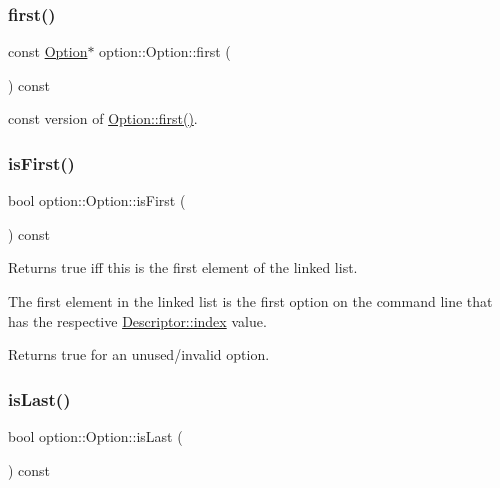\subsubsection{\texorpdfstring{first()}{first()}\hspace{0.1cm}{\footnotesize\ttfamily [2/2]}}
{\footnotesize\ttfamily const \hyperlink{classoption_1_1_option}{Option}$\ast$ option\+::\+Option\+::first (\begin{DoxyParamCaption}{ }\end{DoxyParamCaption}) const\hspace{0.3cm}{\ttfamily [inline]}}

const version of \hyperlink{classoption_1_1_option_abb4e13cd7c90999c8a6b1f871cece283}{Option\+::first()}. \mbox{\label{classoption_1_1_option_af51f53a553ef46110e36008a58466a2e}} 
\subsubsection{\texorpdfstring{is\+First()}{isFirst()}}
{\footnotesize\ttfamily bool option\+::\+Option\+::is\+First (\begin{DoxyParamCaption}{ }\end{DoxyParamCaption}) const\hspace{0.3cm}{\ttfamily [inline]}}



Returns true iff this is the first element of the linked list. 

The first element in the linked list is the first option on the command line that has the respective \hyperlink{structoption_1_1_descriptor_a1fee8ac44f529c99ac2b1149b4c391b1}{Descriptor\+::index} value.

Returns true for an unused/invalid option. \mbox{\label{classoption_1_1_option_a36fa8fde6fce89462ded79ab56180ff7}} 
\subsubsection{\texorpdfstring{is\+Last()}{isLast()}}
{\footnotesize\ttfamily bool option\+::\+Option\+::is\+Last (\begin{DoxyParamCaption}{ }\end{DoxyParamCaption}) const\hspace{0.3cm}{\ttfamily [inline]}}



